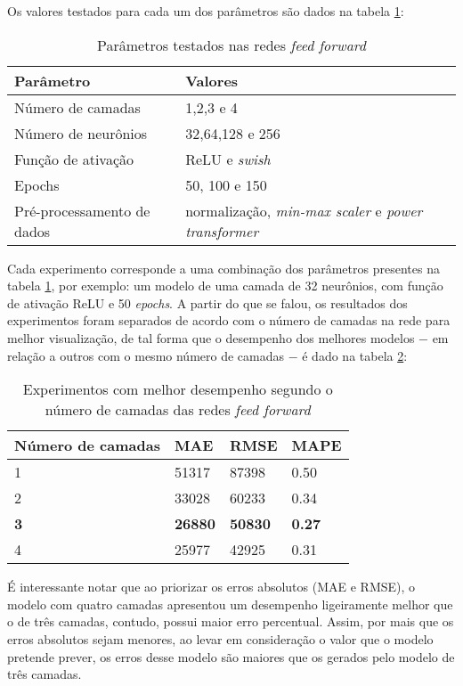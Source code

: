 Os valores testados para cada um dos parâmetros são dados na tabela \ref{tab:param-mlp}:

\begin{table}[H]
    \centering
    \begin{tabular}{ll}
        \toprule
        Parâmetro           & Valores   \\
        \midrule
        Número de camadas   & 1,2,3 e 4 \\
        Número de neurônios & 32,64,128 e 256       \\
        Função de ativação  & ReLU e \textit{swish}  \\
        Epochs              & 50, 100 e 150      \\
        Pré-processamento de dados & normalização, \textit{min-max scaler} e \textit{power transformer}\\
        \bottomrule
    \end{tabular}
    \caption{Parâmetros testados nas redes \textit{feed forward}}
    \label{tab:param-mlp}
\end{table} 

Cada experimento corresponde a uma combinação dos parâmetros presentes na tabela \ref{tab:param-mlp}, por exemplo: um modelo de uma camada de 32 neurônios, com função de ativação ReLU e 50 \textit{epochs}. A partir do que se falou, os resultados dos experimentos foram separados de acordo com o número de camadas na rede para melhor visualização, de tal forma que o desempenho dos melhores modelos $-$ em relação a outros com o mesmo número de camadas $-$ é dado na tabela \ref{tab:res-mlp}:

\begin{table}[H]
    \centering
    \caption{Experimentos com melhor desempenho segundo o número de camadas das redes \textit{feed forward}}
    \begin{tabular}{llll}
    \toprule
    Número de camadas  & MAE & RMSE & MAPE \\
    \midrule
    1 & 51317  & 87398  & 0.50\\
    2 & 33028  & 60233 & 0.34 \\
    \textbf{3} & \textbf{26880}  & \textbf{50830} & \textbf{0.27} \\
    4 & 25977  & 42925 & 0.31 \\
    \bottomrule
    \end{tabular}
    \label{tab:res-mlp}
\end{table}

É interessante notar que ao priorizar os erros absolutos (MAE e RMSE), o modelo 
com quatro camadas apresentou um desempenho ligeiramente
melhor que o de três camadas, contudo, possui maior erro percentual.
Assim, por mais que os erros absolutos sejam menores, ao levar em 
consideração o valor que o modelo pretende prever, os erros desse 
modelo são maiores que os gerados pelo modelo de três camadas. 

